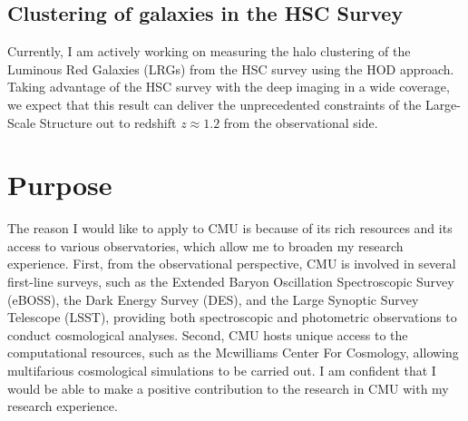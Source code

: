 \documentclass{article}
\begin{document}



\subsection*{Clustering of galaxies in the HSC Survey}

Currently, I am actively working on measuring the halo clustering of the Luminous Red Galaxies (LRGs) from the HSC survey using the HOD approach.
Taking advantage of the HSC survey with the deep imaging in a wide coverage, we expect that this result can deliver the unprecedented constraints of the Large-Scale Structure out to redshift $z\approx1.2$ from the observational side.


\section*{Purpose}

The reason I would like to apply to CMU is because of its rich resources and its access to various observatories, which allow me to broaden my research experience.
First, from the observational perspective, CMU is involved in several first-line surveys, such as the Extended Baryon Oscillation Spectroscopic Survey (eBOSS), the Dark Energy Survey (DES), and the Large Synoptic Survey Telescope (LSST), providing both spectroscopic and photometric observations to conduct cosmological analyses.
Second, CMU hosts unique access to the computational resources, such as the Mcwilliams Center For Cosmology, allowing multifarious cosmological simulations to be carried out.
I am confident that I would be able to make a positive contribution to the research in CMU with my research experience.
\end{document}

